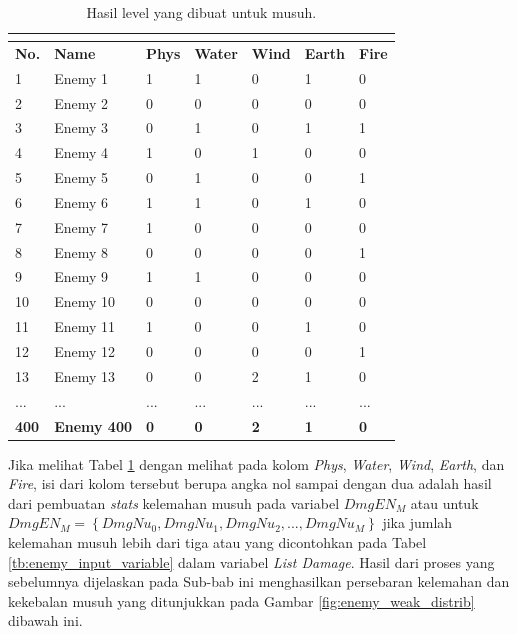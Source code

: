 \begin{longtable}{|l|l|l|l|l|l|l|}
	\caption{Hasil level yang dibuat untuk musuh.}
	\vspace{1ex}
	\label{tb:enemy_weak_distrib}\\
	\hline
	\rowcolor[HTML]{C0C0C0} 
	\textbf{No.} & \textbf{Name} & \textbf{Phys} & \textbf{Water} & \textbf{Wind} & \textbf{Earth} & \textbf{Fire} \\ \hline
	1 & Enemy 1 & 1 & 1 & 0 & 1 & 0 \\ \hline
	2 & Enemy 2 & 0 & 0 & 0 & 0 & 0 \\ \hline
	3 & Enemy 3 & 0 & 1 & 0 & 1 & 1 \\ \hline
	4 & Enemy 4 & 1 & 0 & 1 & 0 & 0 \\ \hline
	5 & Enemy 5 & 0 & 1 & 0 & 0 & 1 \\ \hline
	6 & Enemy 6 & 1 & 1 & 0 & 1 & 0 \\ \hline
	7 & Enemy 7 & 1 & 0 & 0 & 0 & 0 \\ \hline
	8 & Enemy 8 & 0 & 0 & 0 & 0 & 1 \\ \hline
	9 & Enemy 9 & 1 & 1 & 0 & 0 & 0 \\ \hline
	10 & Enemy 10 & 0 & 0 & 0 & 0 & 0 \\ \hline
	11 & Enemy 11 & 1 & 0 & 0 & 1 & 0 \\ \hline
	12 & Enemy 12 & 0 & 0 & 0 & 0 & 1 \\ \hline
	13 & Enemy 13 & 0 & 0 & 2 & 1 & 0 \\ \hline
	... & ... & ... & ... & ... & ... & ... \\ \hline
	\textbf{400} & \textbf{Enemy 400} & \textbf{0} & \textbf{0} & \textbf{2} & \textbf{1} & \textbf{0} \\ \hline
\end{longtable}
\vspace{1ex}

Jika melihat Tabel \ref{tb:enemy_weak_distrib} dengan melihat pada kolom \textit{Phys}, \textit{Water}, \textit{Wind}, \textit{Earth}, dan \textit{Fire}, isi dari kolom tersebut berupa angka nol sampai dengan dua adalah hasil dari pembuatan \textit{stats} kelemahan musuh pada variabel $DmgEN_{M}$ atau untuk $DmgEN_{M} = \left \{ DmgNu_{0}, DmgNu_{1}, DmgNu_{2},..., DmgNu_{M} \right \}$ jika jumlah kelemahan musuh lebih dari tiga atau yang dicontohkan pada Tabel \ref{tb:enemy_input_variable} dalam variabel \textit{List Damage}. Hasil dari proses yang sebelumnya dijelaskan pada Sub-bab ini menghasilkan persebaran kelemahan dan kekebalan musuh yang ditunjukkan pada Gambar \ref{fig:enemy_weak_distrib} dibawah ini.

